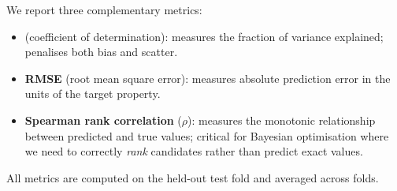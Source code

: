 We report three complementary metrics:
\begin{itemize}[nosep]
    \item \textbf{\Rtwo{}} (coefficient of determination): measures the fraction of variance explained; penalises both bias and scatter.
    \item \textbf{RMSE} (root mean square error): measures absolute prediction error in the units of the target property.
    \item \textbf{Spearman rank correlation} ($\rho$): measures the monotonic relationship between predicted and true values; critical for Bayesian optimisation where we need to correctly \emph{rank} candidates rather than predict exact values.
\end{itemize}
All metrics are computed on the held-out test fold and averaged across folds.
